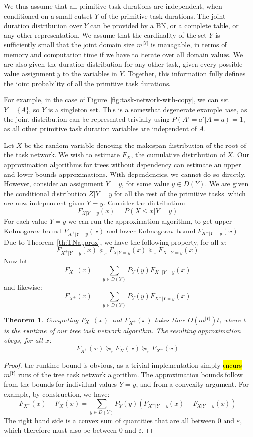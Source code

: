 \documentclass[review]{elsarticle}
\newtheorem{theorem}{Theorem}
\begin{document}
We thus assume that all primitive task durations are independent, when conditioned on
a small cutset $Y$ of the primitive task durations. The joint duration distribution over $Y$
can be provided by a BN, or a complete table, or any other representation. We assume
that the cardinality of the set $Y$ is sufficiently small that the joint domain
size $m^{|Y|}$ is managable, in terms of memory and computation time if we have to
iterate over all domain values. We are also given the duration distribution for any
other task, given every possible value assignment $y$ to the variables in $Y$.
Together, this information fully defines the joint probability of all the 
primitive task durations. 

For example, in the case of Figure~\ref{fig:task-network-with-copy}, we can set $Y=\{ A\}$, so $Y$ is a singleton set.
This is a somewhat degenerate example case, as
the joint distribution can be represented trivially using $P(A'=a'|A=a)=1$,
as  all other primitive task duration variables are independent of $A$.

Let $X$ be the random variable denoting the makespan distribution of the
root of the task network. We wish to estimate $F_X$, the cumulative distribution of $X$.
Our approximation algorithms for trees without dependency can estimate an
upper and lower bounds approximations. With dependencies, we cannot do so directly.
However, consider an assignment $Y=y$, for some value $y\in D(Y)$. We are given the conditional
distribution $Z|Y=y$ for all the rest of the primitive tasks, which are now
independent given $Y=y$. Consider the distribution:
\[
F_{X|Y=y}(x) = P(X\leq x| Y=y)
\]
For each value $Y=y$ we can run the approximation algorithm, to get upper 
Kolmogorov bound $F_{X^+|Y=y}(x)$ and  lower Kolmogorov bound $F_{X^-|Y=y}(x)$. 
Due to Theorem~\ref{th:TNapprox}, we have
the following property, for all $x$:
\[
F_{X^+|Y=y}(x) \succeq_\varepsilon F_{X|Y=y}(x) \succeq_\varepsilon F_{X^-|Y=y}(x)
\]
Now let:
\[
F_{X^-}(x) = \sum_{y\in D(Y)} P_Y(y) F_{X^-|Y=y}(x)
\]
and likewise:
\[
F_{X^+}(x) = \sum_{y\in D(Y)} P_Y(y) F_{X^+|Y=y}(x)
\]

\begin{theorem}
Computing $F_{X^-}(x)$ and $F_{X^+}(x)$ takes time $O(m^{|Y|})t$, where $t$ is the runtime
of our tree task network algorithm. The resulting approximation obeys, for all $x$:
\[
F_{X^+}(x) \succeq_\varepsilon F_{X}(x) \succeq_\varepsilon F_{X^-}(x)
\]
\end{theorem}

\begin{proof}
the runtime bound is obvious, as a trivial implementation simply \hl{encurs} $m^{|Y|}$
runs of the tree task network algorithm. The approximation bounds follow
from the bounds for individual values $Y=y$, and from a convexity argument.
For example, by construction, we have:
\[
F_{X^-}(x) -  F_{X}(x) =  \sum_{y\in D(Y)} P_{Y}(y)(F_{X^-|Y=y}(x) - F_{X|Y=y}(x))
\]
The right hand side is a convex sum of quantities that are all between 0 and $\varepsilon$, which therefore
must also be between 0 and $\varepsilon$.
\end{proof}
\end{document}
